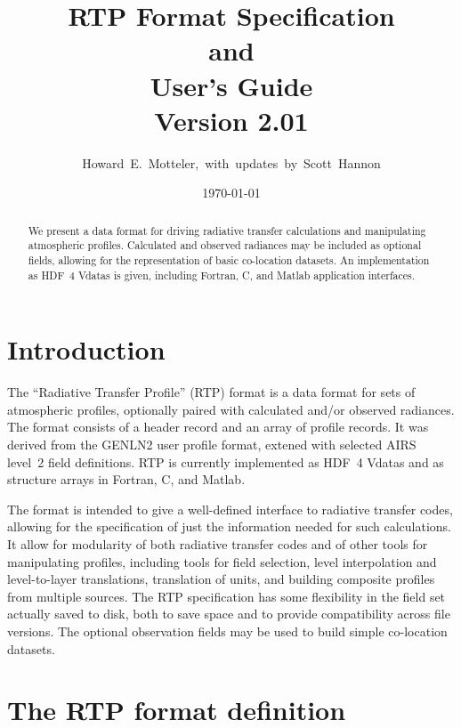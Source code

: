 \documentclass[12pt]{article}
\title{{\bf RTP Format Specification\\
                and\\
        User's Guide}\bigskip\bigskip \\
        {Version 2.01}\bigskip \\ }
\author{Howard~E.~Motteler,~with~updates~by~Scott~Hannon}
\date{\today\vspace{1cm}}
\begin{document}
\maketitle

\begin{abstract}

We present a data format for driving radiative transfer calculations
and manipulating atmospheric profiles.  Calculated and observed
radiances may be included as optional fields, allowing for the
representation of basic co-location datasets.  An implementation as
HDF~4 Vdatas is given, including Fortran, C, and Matlab application
interfaces.

\end{abstract}


\section{Introduction}

The ``Radiative Transfer Profile'' (RTP) format is a data format for
sets of atmospheric profiles, optionally paired with calculated
and/or observed radiances.  The format consists of a header record
and an array of profile records.  It was derived from the GENLN2
user profile format, extened with selected AIRS level~2 field
definitions.  RTP is currently implemented as HDF~4 Vdatas and as
structure arrays in Fortran, C, and Matlab.

The format is intended to give a well-defined interface to radiative
transfer codes, allowing for the specification of just the
information needed for such calculations.  It allow for modularity
of both radiative transfer codes and of other tools for manipulating
profiles, including tools for field selection, level interpolation
and level-to-layer translations, translation of units, and building
composite profiles from multiple sources.  The RTP specification has
some flexibility in the field set actually saved to disk, both to
save space and to provide compatibility across file versions.  The
optional observation fields may be used to build simple co-location
datasets.


\section{The RTP format definition}
\end{document}
